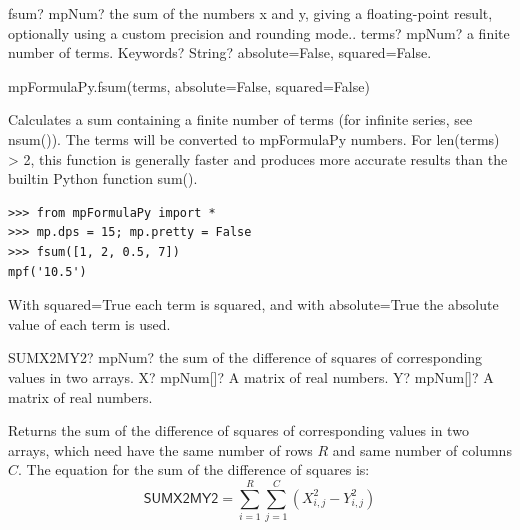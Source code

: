 \vspace{0.3cm}
\begin{mpFunctionsExtract}
	\mpFunctionTwo
	{fsum? mpNum? the sum of the numbers x and y, giving a floating-point result, optionally using a custom precision and rounding mode..}
	{terms? mpNum? a finite number of terms.}
	{Keywords? String? absolute=False, squared=False.}	
\end{mpFunctionsExtract}

\vspace{0.3cm}

mpFormulaPy.fsum(terms, absolute=False, squared=False)

\vpara
Calculates a sum containing a finite number of terms (for infinite series, see nsum()). The terms will be converted to mpFormulaPy numbers. For len(terms) > 2, this function is generally faster and produces more accurate results than the builtin Python function sum().

\begin{lstlisting}
>>> from mpFormulaPy import *
>>> mp.dps = 15; mp.pretty = False
>>> fsum([1, 2, 0.5, 7])
mpf('10.5')
\end{lstlisting}

With squared=True each term is squared, and with absolute=True the absolute value of each term is used.



\begin{mpFunctionsExtract}
	\mpWorksheetFunctionTwoNotImplemented
	{SUMX2MY2? mpNum? the sum of the difference of squares of corresponding values in two arrays.}
	{X? mpNum[]? A matrix of real numbers.}
	{Y? mpNum[]? A matrix of real numbers.}
\end{mpFunctionsExtract}

\vspace{0.3cm}
Returns the sum of the difference of squares of corresponding values in two arrays, which need have the same number of rows $R$ and same number of columns $C$.
The equation for the sum of the difference of squares is: 
\begin{equation}
	\textsf{SUMX2MY2} =  \sum_{i=1}^R \sum_{j=1}^C  \left(X_{i,j}^2 - Y_{i,j}^2 \right)
\end{equation}





